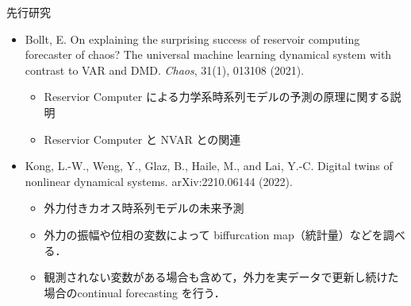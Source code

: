 \begin{frame}{先行研究}
    \begin{itemize}
        \item Bollt, E. On explaining the surprising success of reservoir computing forecaster of chaos? The universal machine learning dynamical system with contrast to VAR and DMD. \textit{Chaos}, 31(1), 013108 (2021). 
            \begin{itemize}
            \item Reservior Computer による力学系時系列モデルの予測の原理に関する説明
            \item Reservior Computer と NVAR との関連
        \end{itemize}
        \item Kong, L.-W., Weng, Y., Glaz, B., Haile, M., and Lai, Y.-C. Digital twins of nonlinear dynamical systems. arXiv:2210.06144 (2022).
            \begin{itemize}
            \item 外力付きカオス時系列モデルの未来予測
            \item 外力の振幅や位相の変数によって biffurcation map（統計量）などを調べる．
            \item 観測されない変数がある場合も含めて，外力を実データで更新し続けた場合のcontinual forecasting を行う．
        \end{itemize}
    \end{itemize}
\end{frame}

